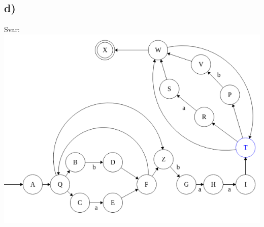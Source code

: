 \documentclass[]{article}
\begin{document}
\subsection*{d)}
Svar: \\
\includegraphics[scale=0.6]{NFAd}
\end{document}
